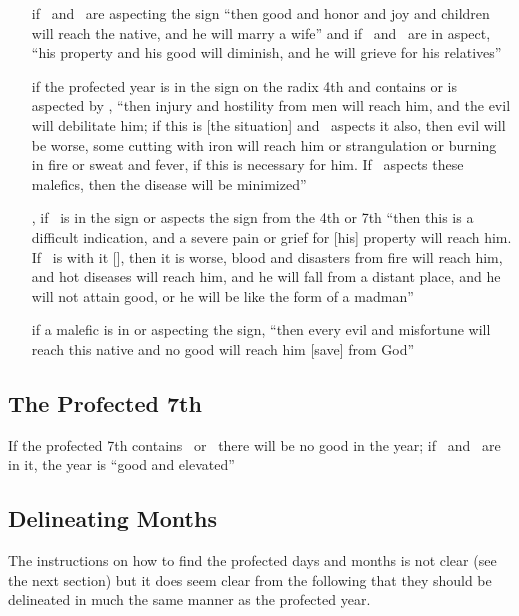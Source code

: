 \begin{itemize}[topsep=0em,itemsep=0em]
\item[\ASC]  if \Jupiter\, and \Venus\, are aspecting the sign ``then good and honor and joy and children will reach the native, and he will marry a wife'' and if \Saturn\, and \Mars\, are in aspect, ``his property and his good will diminish, and he will grieve for his relatives''


\item[\IC] if the profected year is in the sign on the radix 4th and contains or is aspected by \Saturn, ``then injury and hostility from men will reach him, and the evil will debilitate him; if this is [the situation] and \Mars\, aspects it also, then evil will be worse, some cutting with iron will reach him or strangulation or burning in fire or sweat and fever, if this is necessary for him. If \Jupiter\, aspects these malefics, then the disease will be minimized''

\item[\IC,\DSC] if \Saturn\, is in the sign or aspects the sign from the 4th or 7th  ``then this is a difficult indication, and a severe pain or grief for [his] property will reach him. If \Mars\, is with it [\Saturn], then it is worse, blood and disasters from fire will reach him, and hot diseases will reach him, and he will fall from a distant place, and he will not attain good, or he will be like the form of a madman''

\item[\MC]  if a malefic is in or aspecting the sign, ``then every evil and misfortune will reach this native and no good will reach him [save] from God''
\end{itemize}

\subsection{The Profected 7th}
If  the profected 7th contains \Saturn\, or \Mars\, there will be no good in the year; if \Jupiter\, and \Venus\, are in it, the year is ``good and elevated''

\subsection{Delineating Months}
The instructions on how to find the profected days and months is not clear (see the next section) but it does seem clear from the following that they should be delineated in much the same manner as the profected year. 

